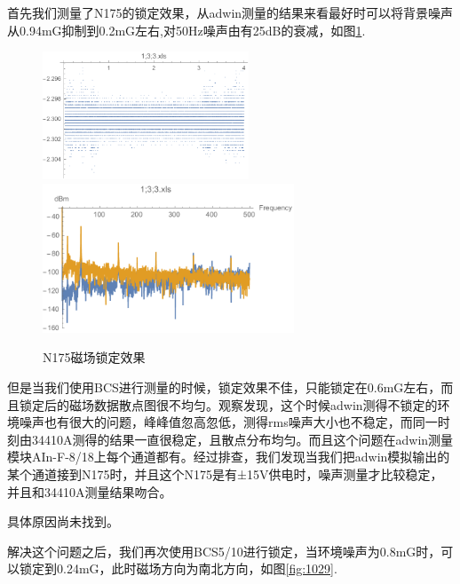 \documentclass[onecolumn,a4paper,10pt]{article}
\begin{document}
首先我们测量了N175的锁定效果，从adwin测量的结果来看最好时可以将背景噪声从0.94mG抑制到0.2mG左右,对50Hz噪声由有25dB的衰减，如图\ref{fig:1091}.
\begin{figure}[htbp]
\centering
\includegraphics[height=1.5in]{20160420n175data}%
\hspace{0.4in}%
\includegraphics[height=1.75in]{20160420n175}
\caption{N175磁场锁定效果}
\label{fig:1091}
\end{figure}

但是当我们使用BCS进行测量的时候，锁定效果不佳，只能锁定在0.6mG左右，而且锁定后的磁场数据散点图很不均匀。观察发现，这个时候adwin测得不锁定的环境噪声也有很大的问题，峰峰值忽高忽低，测得rms噪声大小也不稳定，而同一时刻由34410A测得的结果一直很稳定，且散点分布均匀。而且这个问题在adwin测量模块AIn-F-8/18上每个通道都有。经过排查，我们发现当我们把adwin模拟输出的某个通道接到N175时，并且这个N175是有±15V供电时，噪声测量才比较稳定，并且和34410A测量结果吻合。

具体原因尚未找到。

解决这个问题之后，我们再次使用BCS5/10进行锁定，当环境噪声为0.8mG时，可以锁定到0.24mG，此时磁场方向为南北方向，如图\ref{fig:1029}.
\end{document}
